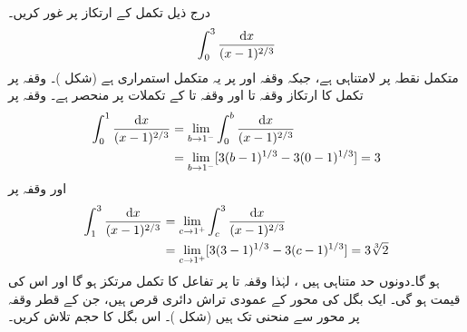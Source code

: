 \\
درج ذیل تکمل کے   ارتکاز پر غور کریں۔
\begin{align*}
\int_0^3\frac{\dif x}{(x-1)^{2/3}}
\end{align*}
متکمل  نقطہ  پر لامتناہی ہے،  جبکہ وقفہ \عددی{[0,1)} اور \عددی{(1,3]} پر یہ متکمل  استمراری ہے (شکل )۔ وقفہ  پر تکمل کا  ارتکاز وقفہ  تا  اور وقفہ  تا   کے تکملات پر منحصر ہے۔ وقفہ  پر 
\begin{align*}
\int_0^1\frac{\dif x}{(x-1)^{2/3}}&=\lim_{b\to 1^-}\int_0^b\frac{\dif x}{(x-1)^{2/3}}\\
&=\lim_{b\to 1^-}[3(b-1)^{1/3}-3(0-1)^{1/3}]=3
\end{align*}
اور وقفہ  پر
\begin{align*}
\int_1^3\frac{\dif x}{(x-1)^{2/3}}&=\lim_{c\to 1^+}\int_c^3\frac{\dif x}{(x-1)^{2/3}}\\
&=\lim_{c\to 1^+}[3(3-1)^{1/3}-3(c-1)^{1/3}]=3\sqrt[3]{2}
\end{align*}
ہو گا۔دونوں حد متناہی ہیں ، لہٰذا وقفہ  تا   پر تفاعل  کا تکمل مرتکز ہو گا اور اس کی قیمت  ہو گی۔
ایک بگل کی محور  کے عمودی تراش دائری قرص ہیں، جن کے قطر وقفہ  پر محور  سے منحنی  تک ہیں (شکل )۔ اس بگل کا حجم تلاش کریں۔

